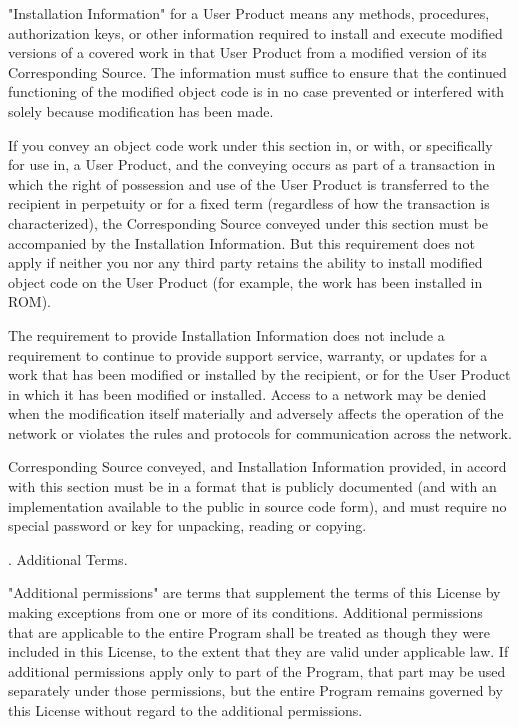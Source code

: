 "Installation Information" for a User Product means any methods,
procedures, authorization keys, or other information required to install
and execute modified versions of a covered work in that User Product from
a modified version of its Corresponding Source.  The information must
suffice to ensure that the continued functioning of the modified object
code is in no case prevented or interfered with solely because
modification has been made.

If you convey an object code work under this section in, or with, or
specifically for use in, a User Product, and the conveying occurs as
part of a transaction in which the right of possession and use of the
User Product is transferred to the recipient in perpetuity or for a
fixed term (regardless of how the transaction is characterized), the
Corresponding Source conveyed under this section must be accompanied
by the Installation Information.  But this requirement does not apply
if neither you nor any third party retains the ability to install
modified object code on the User Product (for example, the work has
been installed in ROM).

The requirement to provide Installation Information does not include a
requirement to continue to provide support service, warranty, or updates
for a work that has been modified or installed by the recipient, or for
the User Product in which it has been modified or installed.  Access to a
network may be denied when the modification itself materially and
adversely affects the operation of the network or violates the rules and
protocols for communication across the network.

Corresponding Source conveyed, and Installation Information provided,
in accord with this section must be in a format that is publicly
documented (and with an implementation available to the public in
source code form), and must require no special password or key for
unpacking, reading or copying.

. Additional Terms.

"Additional permissions" are terms that supplement the terms of this
License by making exceptions from one or more of its conditions.
Additional permissions that are applicable to the entire Program shall
be treated as though they were included in this License, to the extent
that they are valid under applicable law.  If additional permissions
apply only to part of the Program, that part may be used separately
under those permissions, but the entire Program remains governed by
this License without regard to the additional permissions.

